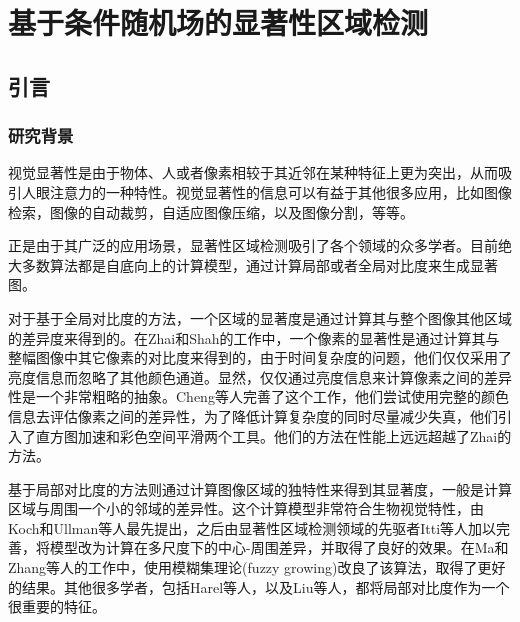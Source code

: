 
\chapter{基于条件随机场的显著性区域检测}
\section{引言}
\subsection{研究背景}
视觉显著性是由于物体、人或者像素相较于其近邻在某种特征上更为突出，从而吸引人眼注意力的一种特性。视觉显著性的信息可以有益于其他很多应用，比如图像检索\cite{tsai2012hierarchical}\cite{fang2012effective}，图像的自动裁剪\cite{shechtman2013methods}\cite{deigmoeller2010context}，自适应图像压缩\cite{christopoulos2000jpeg2000}，以及图像分割\cite{jiang2011automatic}\cite{han2006unsupervised}，等等。

正是由于其广泛的应用场景，显著性区域检测吸引了各个领域的众多学者。目前绝大多数算法都是自底向上的计算模型，通过计算局部或者全局对比度来生成显著图。

对于基于全局对比度的方法，一个区域的显著度是通过计算其与整个图像其他区域的差异度来得到的。在Zhai和Shah的工作中\cite{zhai2006visual}，一个像素的显著性是通过计算其与整幅图像中其它像素的对比度来得到的，由于时间复杂度的问题，他们仅仅采用了亮度信息而忽略了其他颜色通道。显然，仅仅通过亮度信息来计算像素之间的差异性是一个非常粗略的抽象。Cheng等人\cite{cheng2011global}完善了这个工作，他们尝试使用完整的颜色信息去评估像素之间的差异性，为了降低计算复杂度的同时尽量减少失真，他们引入了直方图加速和彩色空间平滑两个工具。他们的方法在性能上远远超越了Zhai的方法。

基于局部对比度的方法则通过计算图像区域的独特性来得到其显著度，一般是计算区域与周围一个小的邻域的差异性。这个计算模型非常符合生物视觉特性，由Koch和Ullman等人最先提出\cite{koch1987shifts}，之后由显著性区域检测领域的先驱者Itti等人加以完善\cite{itti1998model}，将模型改为计算在多尺度下的中心-周围差异，并取得了良好的效果。在Ma和Zhang等人的工作中\cite{ma2003contrast}，使用模糊集理论(fuzzy growing)改良了该算法，取得了更好的结果。其他很多学者，包括Harel等人\cite{harel2006graph}，以及Liu等人\cite{liu2011learning}，都将局部对比度作为一个很重要的特征。

